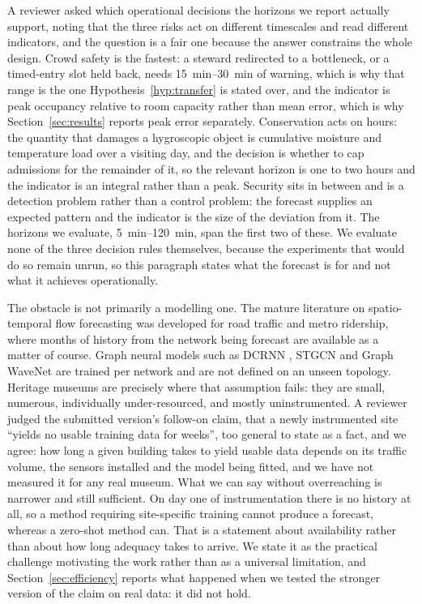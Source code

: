 \documentclass[11pt]{article}
\theoremstyle{plain}
\theoremstyle{definition}
\theoremstyle{remark}
\newif\ifrevisionmarkup
\newcommand{\new}[1]{\ifrevisionmarkup\textcolor{revision}{#1}\else#1\fi}
\begin{document}
\new{A reviewer asked which operational decisions the horizons we report actually support, noting that the three risks act on different timescales and read different indicators, and the question is a fair one because the answer constrains the whole design. Crowd safety is the fastest: a steward redirected to a bottleneck, or a timed-entry slot held back, needs \SIrange{15}{30}{\minute} of warning, which is why that range is the one Hypothesis~\ref{hyp:transfer} is stated over, and the indicator is peak occupancy relative to room capacity rather than mean error, which is why Section~\ref{sec:results} reports peak error separately. Conservation acts on hours: the quantity that damages a hygroscopic object is cumulative moisture and temperature load over a visiting day, and the decision is whether to cap admissions for the remainder of it, so the relevant horizon is one to two hours and the indicator is an integral rather than a peak. Security sits in between and is a detection problem rather than a control problem: the forecast supplies an expected pattern and the indicator is the size of the deviation from it. The horizons we evaluate, \SIrange{5}{120}{\minute}, span the first two of these. We evaluate none of the three decision rules themselves, because the experiments that would do so remain unrun, so this paragraph states what the forecast is for and not what it achieves operationally.}

The obstacle is \new{not primarily a modelling one}. The mature literature on spatio-temporal flow forecasting was developed for road traffic and metro ridership, where months of history from the network being forecast are available as a matter of course. Graph neural models such as DCRNN \citep{li2018dcrnn}, STGCN \citep{yu2018stgcn} and Graph WaveNet \citep{wu2019graphwavenet} are trained per network and are not defined on an unseen topology. Heritage museums are precisely where that assumption fails: they are small, numerous, individually under-resourced, and mostly uninstrumented. \new{A reviewer judged the submitted version's follow-on claim, that a newly instrumented site ``yields no usable training data for weeks'', too general to state as a fact, and we agree: how long a given building takes to yield usable data depends on its traffic volume, the sensors installed and the model being fitted, and we have not measured it for any real museum. What we can say without overreaching is narrower and still sufficient. On day one of instrumentation there is no history at all, so a method requiring site-specific training cannot produce a forecast, whereas a zero-shot method can. That is a statement about availability rather than about how long adequacy takes to arrive. We state it as the practical challenge motivating the work rather than as a universal limitation, and Section~\ref{sec:efficiency} reports what happened when we tested the stronger version of the claim on real data: it did not hold.}
\end{document}
